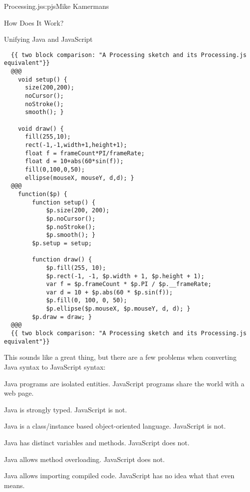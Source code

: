 \begin{aosachapter}{Processing.js}{s:pjs}{Mike Kamermans}
\begin{aosasect1}{How Does It Work?}
\begin{aosasect2}{Unifying Java and JavaScript}

\begin{verbatim}
  {{ two block comparison: "A Processing sketch and its Processing.js equivalent"}}
  @@@
    void setup() {
      size(200,200);
      noCursor();
      noStroke();
      smooth(); }

    void draw() {
      fill(255,10);
      rect(-1,-1,width+1,height+1);
      float f = frameCount*PI/frameRate;
      float d = 10+abs(60*sin(f));
      fill(0,100,0,50);
      ellipse(mouseX, mouseY, d,d); }
  @@@
    function($p) {
        function setup() {
            $p.size(200, 200);
            $p.noCursor();
            $p.noStroke();
            $p.smooth(); }
        $p.setup = setup;

        function draw() {
            $p.fill(255, 10);
            $p.rect(-1, -1, $p.width + 1, $p.height + 1);
            var f = $p.frameCount * $p.PI / $p.__frameRate;
            var d = 10 + $p.abs(60 * $p.sin(f));
            $p.fill(0, 100, 0, 50);
            $p.ellipse($p.mouseX, $p.mouseY, d, d); }
        $p.draw = draw; }
  @@@
  {{ two block comparison: "A Processing sketch and its Processing.js equivalent"}}
\end{verbatim}

This sounds like a great thing, but there are a few problems when
converting Java syntax to JavaScript syntax:

\begin{aosaenumerate}

\item Java programs are isolated entities. JavaScript programs share
  the world with a web page.

\item Java is strongly typed. JavaScript is not.

\item Java is a class/instance based object-oriented language. JavaScript is not.

\item Java has distinct variables and methods. JavaScript does not.

\item Java allows method overloading. JavaScript does not.

\item Java allows importing compiled code. JavaScript has no idea what
  that even means.


\end{aosaenumerate}
\end{aosasect2}
\end{aosasect1}
\end{aosachapter}
